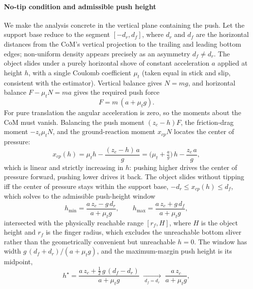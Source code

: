 \documentclass[10pt, conference]{IEEEtran}
\begin{document}
\paragraph{No-tip condition and admissible push height}
We make the analysis concrete in the vertical plane containing the push. Let the support base reduce to the segment $[-d_r, d_f]$, where $d_r$ and $d_f$ are the horizontal distances from the CoM's vertical projection to the trailing and leading bottom edges; non-uniform density appears precisely as an asymmetry $d_f \neq d_r$. The object slides under a purely horizontal shove of constant acceleration $a$ applied at height $h$, with a single Coulomb coefficient $\mu_t$ (taken equal in stick and slip, consistent with the estimator). Vertical balance gives $N = mg$, and horizontal balance $F - \mu_t N = ma$ gives the required push force
\begin{equation}
    F = m\,(a + \mu_t g).
    \label{eq:shove_force}
\end{equation}
For pure translation the angular acceleration is zero, so the moments about the CoM must vanish. Balancing the push moment $(z_c - h)F$, the friction-drag moment $-z_c \mu_t N$, and the ground-reaction moment $x_{cp} N$ locates the center of pressure:
\begin{equation}
    x_{cp}(h) = \mu_t h - \frac{(z_c - h)\,a}{g}
              = \Big(\mu_t + \tfrac{a}{g}\Big)\,h - \frac{z_c\, a}{g},
    \label{eq:cop}
\end{equation}
which is linear and strictly increasing in $h$: pushing higher drives the center of pressure forward, pushing lower drives it back. The object slides without tipping iff the center of pressure stays within the support base, $-d_r \le x_{cp}(h) \le d_f$, which solves to the admissible push-height window
\begin{equation}
    h_{\min} = \frac{a\,z_c - g\,d_r}{a + \mu_t g}, \qquad
    h_{\max} = \frac{a\,z_c + g\,d_f}{a + \mu_t g},
    \label{eq:hwindow}
\end{equation}
intersected with the physically reachable range $[r_f, H]$, where $H$ is the object height and $r_f$ is the finger radius, which excludes the unreachable bottom sliver rather than the geometrically convenient but unreachable $h=0$. The window has width $g\,(d_f + d_r)/(a + \mu_t g)$, and the maximum-margin push height is its midpoint,
\begin{equation}
    h^{\star} = \frac{a\,z_c + \tfrac{1}{2}\,g\,(d_f - d_r)}{a + \mu_t g}
    \;\xrightarrow[\;d_f=d_r\;]{}\; \frac{a\,z_c}{a + \mu_t g},
    \label{eq:hstar}
\end{equation}
\end{document}
